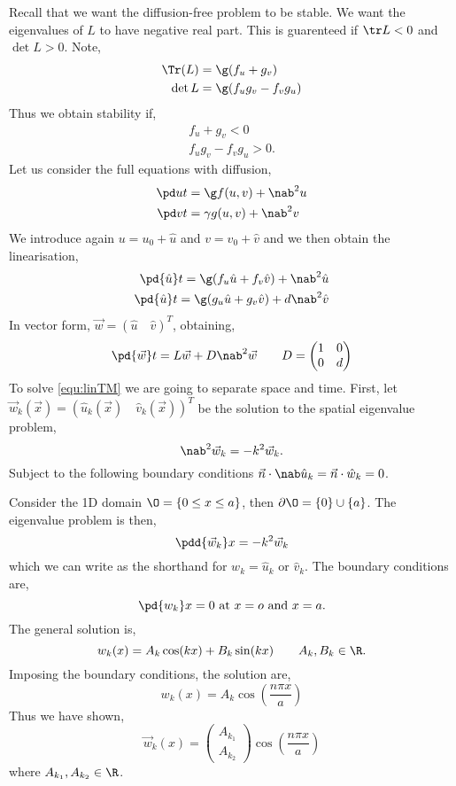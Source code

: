 Recall that we want the diffusion-free problem to be stable. We want the eigenvalues of $L$ to have negative real part. This is guarenteed if $\tr L < 0$ and $\det L > 0$. Note,
\begin{align*}
  \Tr(L) &= \g(f_u + g_v)\\
  \det L &= \g (f_u g_v - f_v g_u)
\end{align*}
Thus we obtain stability if,
\begin{align}
  f_u + g_v < 0 \tag{I}\\
  f_ug_v - f_vg_u > 0\tag{II}.
\end{align}
Let us consider the full equations with diffusion,
\begin{align*}
  \pd u t &= \g f(u, v) + \nab^2 u \label{cond:linStab1}\\
  \pd v t &= \gamma g(u, v) + \nab^2 v \label{cond:linStab2}
\end{align*}
We introduce again $u = u_0 + \hat u$ and $v = v_0 + \hat v$ and we then obtain the linearisation,
\begin{align*}
  \pd {\hat u} t = \g(f_u \hat u + f_v \hat v) + \nab^2 \hat u \\
  \pd {\hat u} t = \g(g_u \hat u + g_v \hat v) + d\nab^2 \hat v
\end{align*}
In vector form, $\vec w = (\hat u \quad \hat v)^T$, obtaining,
\begin{equation}
  \pd {\vec w} t = L\vec w + D\nab^2 \vec w \qquad D = \begin{pmatrix}
    1 & 0 \\ 0 & d
  \end{pmatrix}\label{equ:linTM}
\end{equation}
To solve \ref{equ:linTM} we are going to separate space and time. First, let $\vec w_k(\vec x) = (\hat u_k(\vec x) \quad \hat v_k(\vec x))^T$ be the solution to the spatial eigenvalue problem,
$$ \nab^2 \vec w_k = -k^2 \vec w_k. $$
Subject to the following boundary conditions $\vec n \cdot \nab \hat u_k = \vec n \cdot \hat w_k = 0$.

\begin{eg}
  Consider the 1D domain $\O = \{0 \le x \le a\}$, then $\partial \O = \{0\} \cup \{a\}$. The eigenvalue problem is then,
  $$ \pdd {\vec w_k} x = -k^2 \vec w_k$$
  which we can write as the shorthand for $w_k = \hat u_k$ or $\hat v_k$. The boundary conditions are,
  $$ \pd {w_k} x = 0 \text{ at } x = o \text{ and } x= a. $$
  The general solution is,
  $$ w_k(x) = A_k\cos (kx) + B_k\sin (kx) \qquad A_k, B_k \in \R. $$
  Imposing the boundary conditions, the solution are,
  $$ w_k(x) = A_k \cos \left(\frac{n\pi x}{a}\right) $$
  Thus we have shown,
  $$ \vec w_k(x) = \begin{pmatrix}
    A_{k_1} \\ A_{k_2}
  \end{pmatrix} \cos \left(\frac{n\pi x}{a}\right)$$
  where $A_{k_1}, A_{k_2} \in \R$.
\end{eg}

